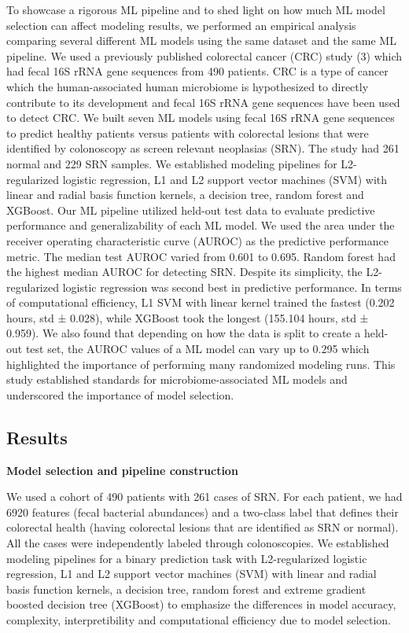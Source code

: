 \documentclass[11pt,]{article}
\begin{document}
To showcase a rigorous ML pipeline and to shed light on how much ML
model selection can affect modeling results, we performed an empirical
analysis comparing several different ML models using the same dataset
and the same ML pipeline. We used a previously published colorectal
cancer (CRC) study (3) which had fecal 16S rRNA gene sequences from 490
patients. CRC is a type of cancer which the human-associated human
microbiome is hypothesized to directly contribute to its development and
fecal 16S rRNA gene sequences have been used to detect CRC. We built
seven ML models using fecal 16S rRNA gene sequences to predict healthy
patients versus patients with colorectal lesions that were identified by
colonoscopy as screen relevant neoplasias (SRN). The study had 261
normal and 229 SRN samples. We established modeling pipelines for
L2-regularized logistic regression, L1 and L2 support vector machines
(SVM) with linear and radial basis function kernels, a decision tree,
random forest and XGBoost. Our ML pipeline utilized held-out test data
to evaluate predictive performance and generalizability of each ML
model. We used the area under the receiver operating characteristic
curve (AUROC) as the predictive performance metric. The median test
AUROC varied from 0.601 to 0.695. Random forest had the highest median
AUROC for detecting SRN. Despite its simplicity, the L2-regularized
logistic regression was second best in predictive performance. In terms
of computational efficiency, L1 SVM with linear kernel trained the
fastest (0.202 hours, std ± 0.028), while XGBoost took the longest
(155.104 hours, std ± 0.959). We also found that depending on how the
data is split to create a held-out test set, the AUROC values of a ML
model can vary up to 0.295 which highlighted the importance of
performing many randomized modeling runs. This study established
standards for microbiome-associated ML models and underscored the
importance of model selection.

\subsection{Results}\label{results}

\textbf{Model selection and pipeline construction}

We used a cohort of 490 patients with 261 cases of SRN. For each
patient, we had 6920 features (fecal bacterial abundances) and a
two-class label that defines their colorectal health (having colorectal
lesions that are identified as SRN or normal). All the cases were
independently labeled through colonoscopies. We established modeling
pipelines for a binary prediction task with L2-regularized logistic
regression, L1 and L2 support vector machines (SVM) with linear and
radial basis function kernels, a decision tree, random forest and
extreme gradient boosted decision tree (XGBoost) to emphasize the
differences in model accuracy, complexity, interpretibility and
computational efficiency due to model selection.
\end{document}
